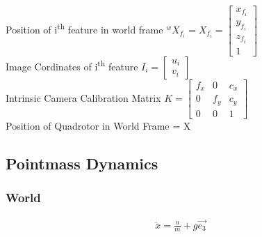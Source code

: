 \documentclass{paper}
\begin{document}
Position of i\textsuperscript{th} feature in world frame
${}^{w}X_{f_{i}} = X_{f_{i}} = 
\begin{bmatrix} x_{f_{i}}\\y_{f_{i}}\\z_{f_{i}}\\1 \end{bmatrix}$\\

Image Cordinates of i\textsuperscript{th} feature
$I_{i} =\begin{bmatrix} u_{i}\\v_{i} \end{bmatrix} $\\

Intrinsic Camera Calibration  Matrix 
$K = \begin{bmatrix} f_{x} & 0 & c_{x} \\ 0 & f_{y} & c_{y}\\ 0 & 0 & 1  \end{bmatrix} $\\

Position of Quadrotor in World Frame = X
\subsection{Pointmass Dynamics}

\subsubsection{World}
\begin{gather}
\ddot{x} = \frac{u}{m} + g\vec{e_3}
\end{gather}
\end{document}
